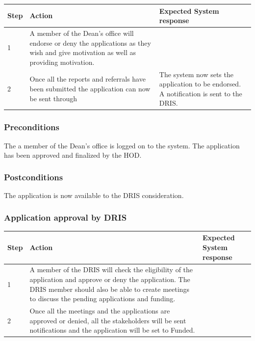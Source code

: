 \documentclass[12pt]{article}
\begin{document}
\begin{center}
\begin{tabular}{|l|p{6cm}|p{8cm}|}
\hline
Step & Action & Expected System response \\
\hline
1 & A member of the Dean's office will endorse or deny the applications as they wish and give motivation as well as providing motivation. \\
\hline
2 & Once all the reports and referrals have been submitted the application can now be sent through  & The system now sets the application to be endorsed. A notification is sent to the DRIS. \\
\hline
\end{tabular}
\end{center}

\subsubsection*{Preconditions}
The a member of the Dean's office is logged on to the system. The application has been approved and finalized by the HOD.

\subsubsection*{Postconditions}
The application is now available to the DRIS consideration.

\subsubsection{Application approval by DRIS}

\begin{center}
\begin{tabular}{|l|p{6cm}|p{8cm}|}
\hline
Step & Action & Expected System response \\
\hline
1 & A member of the DRIS will check the eligibility of the application and approve or deny the application. The DRIS member should also be able to create meetings to discuss the pending applications and funding. \\
\hline
2 & Once all the meetings and the applications are approved or denied, all the stakeholders will be sent notifications and the application will be set to Funded. \\
\hline
\end{tabular}
\end{center}
\end{document}
